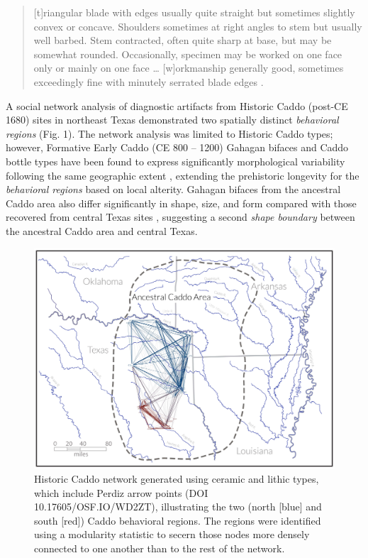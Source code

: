 \documentclass[smallextended]{svjour3}       %
\begin{document}
\begin{quote}
{[}t{]}riangular blade with edges usually quite straight but sometimes
slightly convex or concave. Shoulders sometimes at right angles to stem
but usually well barbed. Stem contracted, often quite sharp at base, but
may be somewhat rounded. Occasionally, specimen may be worked on one
face only or mainly on one face \ldots{} {[}w{]}orkmanship generally
good, sometimes exceedingly fine with minutely serrated blade edges
\cite[504]{RN5769}.
\end{quote}

A social network analysis of diagnostic artifacts from Historic Caddo
(post-CE 1680) sites in northeast Texas demonstrated two spatially
distinct \emph{behavioral regions} \cite{RN8031} (Fig. 1). The network
analysis was limited to Historic Caddo types; however, Formative Early
Caddo (CE 800 -- 1200) Gahagan bifaces and Caddo bottle types have been
found to express significantly morphological variability following the
same geographic extent \cite{RN8074,RN7927,RN8370,RN8312}, extending the
prehistoric longevity for the \emph{behavioral regions} based on local
alterity. Gahagan bifaces from the ancestral Caddo area also differ
significantly in shape, size, and form compared with those recovered
from central Texas sites \cite{RN8322}, suggesting a second \emph{shape
boundary} between the ancestral Caddo area and central Texas.

\begin{figure}
\includegraphics[width=1\linewidth]{ms-figs/figure1} \caption{Historic Caddo network generated using ceramic and lithic types, which include Perdiz arrow points (DOI 10.17605/OSF.IO/WD2ZT), illustrating the two (north [blue] and south [red]) Caddo behavioral regions. The regions were identified using a modularity statistic to secern those nodes more densely connected to one another than to the rest of the network.}\label{fig:fig1}
\end{figure}
\end{document}
